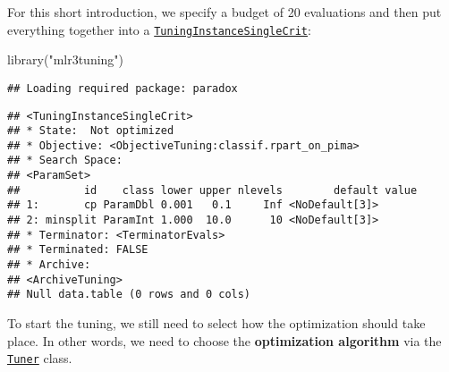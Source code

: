 \documentclass[
]{scrbook}
\newenvironment{Shaded}{\begin{snugshade}}{\end{snugshade}}
\newcommand{\AttributeTok}[1]{\textcolor[rgb]{0.77,0.63,0.00}{#1}}
\newcommand{\DecValTok}[1]{\textcolor[rgb]{0.00,0.00,0.81}{#1}}
\newcommand{\FunctionTok}[1]{\textcolor[rgb]{0.00,0.00,0.00}{#1}}
\newcommand{\NormalTok}[1]{#1}
\newcommand{\OtherTok}[1]{\textcolor[rgb]{0.56,0.35,0.01}{#1}}
\newcommand{\SpecialCharTok}[1]{\textcolor[rgb]{0.00,0.00,0.00}{#1}}
\newcommand{\StringTok}[1]{\textcolor[rgb]{0.31,0.60,0.02}{#1}}
\renewenvironment{Shaded} {\begin{snugshade}\small} {\end{snugshade}}
\begin{document}
For this short introduction, we specify a budget of 20 evaluations and then put everything together into a \href{https://mlr3tuning.mlr-org.com/reference/TuningInstanceSingleCrit.html}{\texttt{TuningInstanceSingleCrit}}:

\begin{Shaded}
\begin{Highlighting}[]
\FunctionTok{library}\NormalTok{(}\StringTok{"mlr3tuning"}\NormalTok{)}
\end{Highlighting}
\end{Shaded}

\begin{verbatim}
## Loading required package: paradox
\end{verbatim}

\begin{Shaded}
\end{Shaded}

\begin{verbatim}
## <TuningInstanceSingleCrit>
## * State:  Not optimized
## * Objective: <ObjectiveTuning:classif.rpart_on_pima>
## * Search Space:
## <ParamSet>
##          id    class lower upper nlevels        default value
## 1:       cp ParamDbl 0.001   0.1     Inf <NoDefault[3]>      
## 2: minsplit ParamInt 1.000  10.0      10 <NoDefault[3]>      
## * Terminator: <TerminatorEvals>
## * Terminated: FALSE
## * Archive:
## <ArchiveTuning>
## Null data.table (0 rows and 0 cols)
\end{verbatim}

To start the tuning, we still need to select how the optimization should take place.
In other words, we need to choose the \textbf{optimization algorithm} via the \href{https://mlr3tuning.mlr-org.com/reference/Tuner.html}{\texttt{Tuner}} class.
\end{document}
